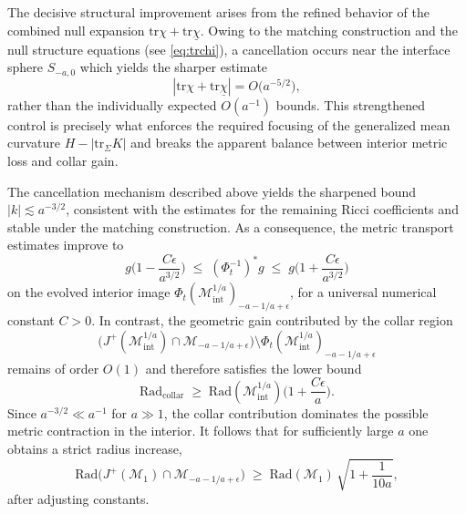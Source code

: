 \documentclass{amsart}
\newcommand{\tr}{\mbox{tr}}
\begin{document}
\noindent The decisive structural improvement arises from the refined behavior of the combined null
expansion $\tr\chi+\tr\underline\chi$. Owing to the matching construction and the null
structure equations (see \eqref{eq:trchi}), a cancellation occurs near the interface
sphere $S_{-a,0}$ which yields the sharper estimate
\[
|\tr\chi+\tr\underline\chi|
=
O\!\big(a^{-5/2}\big),
\]
rather than the individually expected $O(a^{-1})$ bounds. This strengthened control is
precisely what enforces the required focusing of the generalized mean curvature
$H-|\tr_{\Sigma}K|$ and breaks the apparent balance between interior metric loss and
collar gain.


The cancellation mechanism described above yields the sharpened bound
$|k|\lesssim a^{-3/2}$, consistent with the estimates for the remaining Ricci
coefficients and stable under the matching construction. As a consequence, the metric
transport estimates improve to
\begin{equation}
\label{eq:metric-refined}
g\Big(1-\frac{C\epsilon}{a^{3/2}}\Big)
\;\le\;
(\Phi_t^{-1})^{*}g
\;\le\;
g\Big(1+\frac{C\epsilon}{a^{3/2}}\Big)
\end{equation}
on the evolved interior image
$\Phi_t(\mathcal M^{1/a}_{\mathrm{int}})_{-a-1/a+\epsilon}$, for a universal numerical
constant $C>0$. In contrast, the geometric gain contributed by the collar region
\[
\Big(J^{+}(\mathcal M^{1/a}_{\mathrm{int}})\cap \mathcal M_{-a-1/a+\epsilon}\Big)
\setminus
\Phi_t(\mathcal M^{1/a}_{\mathrm{int}})_{-a-1/a+\epsilon}
\]
remains of order $O(1)$ and therefore satisfies the lower bound
\begin{equation}
\label{eq:collar-refined}
\text{Rad}_{\mathrm{collar}}
\;\ge\;
\text{Rad}(\mathcal M^{1/a}_{\mathrm{int}})
\Big(1+\frac{C\epsilon}{a}\Big).
\end{equation}
Since $a^{-3/2}\ll a^{-1}$ for $a\gg1$, the collar contribution dominates the possible
metric contraction in the interior. It follows that for sufficiently large $a$ one obtains
a strict radius increase,
\begin{equation}
\label{eq:radius-growth-final}
\text{Rad}\!\Big(J^{+}(\mathcal M_{1})\cap \mathcal M_{-a-1/a+\epsilon}\Big)
\;\ge\;
\text{Rad}(\mathcal M_{1})\,
\sqrt{1+\frac{1}{10a}},
\end{equation}
after adjusting constants.
\end{document}
